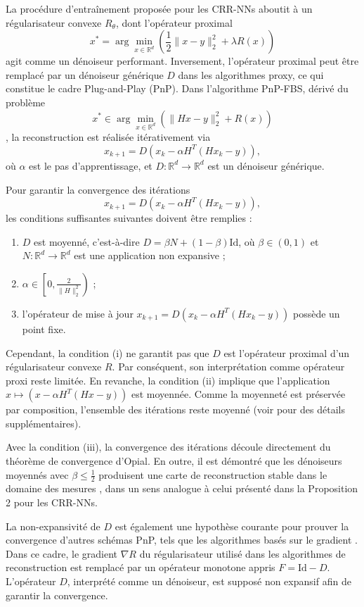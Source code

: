 \documentclass[a4paper, 12pt]{report} %
\begin{document}
La procédure d'entraînement proposée pour les CRR-NNs aboutit à un régularisateur convexe \( R_\theta \), dont l'opérateur proximal 
\[
x^* = \arg \min_{x \in \mathbb{R}^d} \left( \frac{1}{2} \| x - y \|_2^2 + \lambda R(x) \right)
\]
agit comme un dénoiseur performant. Inversement, l'opérateur proximal peut être remplacé par un dénoiseur générique \( D \) dans les algorithmes proxy, ce qui constitue le cadre Plug-and-Play (PnP). Dans l'algorithme PnP-FBS, dérivé du problème 
\[
x^* \in \arg \min_{x \in \mathbb{R}^d} \left( \| Hx - y \|_2^2 + R(x) \right)
\]
\cite{beck2009fast}, la reconstruction est réalisée itérativement via 
\[
x_{k+1} = D \left( x_k - \alpha H^T (H x_k - y) \right),
\]
où \( \alpha \) est le pas d'apprentissage, et \( D : \mathbb{R}^d \to \mathbb{R}^d \) est un dénoiseur générique.

Pour garantir la convergence des itérations 
\[
x_{k+1} = D \left( x_k - \alpha H^T (H x_k - y) \right),
\]
les conditions suffisantes suivantes doivent être remplies :
\begin{enumerate}
    \item \( D \) est moyenné, c'est-à-dire \( D = \beta N + (1 - \beta) \text{Id} \), où \( \beta \in (0, 1) \) et \( N : \mathbb{R}^d \to \mathbb{R}^d \) est une application non expansive ;
    \item \( \alpha \in \left[ 0, \frac{2}{\|H\|_2^2} \right) \) ;
    \item l'opérateur de mise à jour \( x_{k+1} = D \left( x_k - \alpha H^T (H x_k - y) \right) \) possède un point fixe.
\end{enumerate}

Cependant, la condition (i) ne garantit pas que \( D \) est l'opérateur proximal d'un régularisateur convexe \( R \). Par conséquent, son interprétation comme opérateur proxi reste limitée. En revanche, la condition (ii) implique que l'application \( x \mapsto \left( x - \alpha H^T (Hx - y) \right) \) est moyennée. Comme la moyenneté est préservée par composition, l'ensemble des itérations reste moyenné (voir \cite{lecun1989backpropagation} pour des détails supplémentaires). 

Avec la condition (iii), la convergence des itérations découle directement du théorème de convergence d'Opial. En outre, il est démontré que les dénoiseurs moyennés avec \( \beta \leq \frac{1}{2} \) produisent une carte de reconstruction stable dans le domaine des mesures \cite{beck2009fast}, dans un sens analogue à celui présenté dans la Proposition 2 pour les CRR-NNs.

La non-expansivité de \( D \) est également une hypothèse courante pour prouver la convergence d'autres schémas PnP, tels que les algorithmes basés sur le gradient \cite{pramanik2023memory}. Dans ce cadre, le gradient \( \nabla R \) du régularisateur utilisé dans les algorithmes de reconstruction est remplacé par un opérateur monotone appris \( F = \text{Id} - D \). L'opérateur \( D \), interprété comme un dénoiseur, est supposé non expansif afin de garantir la convergence.



\end{document}
